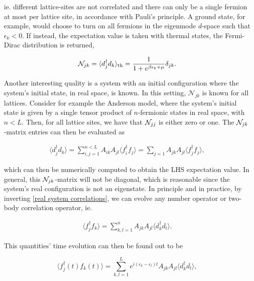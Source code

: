 \documentclass{homework}
\begin{document}
ie. different lattice-sites are not correlated and there can only be a single fermion at most per lattice site, in accordance with Pauli's principle. A ground state, for example, would choose to turn on all fermions in the eigenmode $d$-space such that $\epsilon_k < 0$. If instead, the expectation value is taken with thermal states, the Fermi-Dirac distribution is returned, 

\begin{equation}
    \mathcal{N}_{jk} = \langle d_j^\dagger d_k \rangle_{\textnormal{th}} =  \frac{1}{1+e^{\beta \epsilon_k + \mu}} \delta_{jk}.
\end{equation}

Another interesting quality is a system with an initial configuration where the system's initial state, in real space, is known. In this setting, $\mathcal{N}_{jk}$ is known for all lattices. Consider for example the Anderson model, where the system's initial state is given by a single tensor product of $n$-fermionic states in real space, with $n<L$. Then, for all lattice sites, we have that $\mathcal{N}_{jj}$ is either zero or one. The $\mathcal{N}_{jk}$-matrix entries can then be evaluated as 

\begin{align*}
    \langle d_j^\dagger d_k \rangle = \sum_{i,j = 1}^{n < L} A_{ik} A_{jl} \langle f_i^\dagger f_j \rangle = \sum_{j=1} A_{jk} A_{jl} \langle f_j^\dagger f_j \rangle,
    \label{real system correlations}
\end{align*}

which can then be numerically computed to obtain the LHS expectation value. In general, this $\mathcal{N}_{jk}$-matrix will not be diagonal, which is reasonable since the system's real configuration is not an eigenstate. In principle and in practice, by inverting \eqref{real system correlations}, we can evolve any number operator or two-body correlation operator, ie.

\begin{align}
    \langle f_j^\dagger f_k \rangle = \sum_{k,l =1}^{n} A_{jk} A_{jl} \langle d_k^\dagger d_l \rangle.
\end{align}

This quantities' time evolution can then be found out to be 

\begin{equation}
    \langle f_j^\dagger(t) f_k(t) \rangle = \sum_{k,l =1}^{L} e^{i(\epsilon_k - \epsilon_l)t}A_{jk} A_{jl} \langle d_k^\dagger d_l \rangle,
\end{equation}
\end{document}
